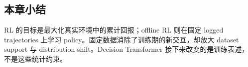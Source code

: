 
\subsection{本章小结}

RL 的目标是最大化真实环境中的累计回报；offline RL 则在固定 logged trajectories 上学习 policy。固定数据消除了训练期的新交互，却放大 dataset support 与 distribution shift。Decision Transformer 接下来改变的是训练表述，不是这些统计约束。

